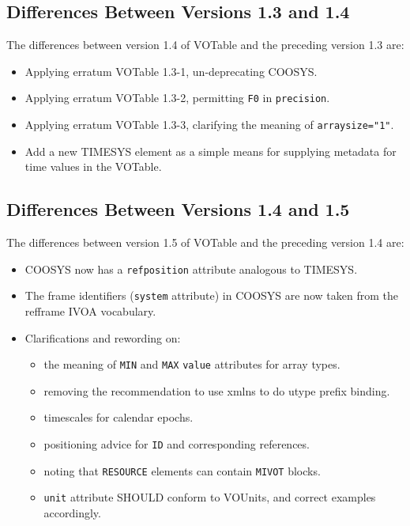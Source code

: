 \documentclass[11pt,a4paper]{ivoa}
\let\fg=\color
\def\attr#1{{\tt{\fg{DarkRed}#1}}}
\def\elem#1{{\tt{\fg{DarkRed}#1}}}
\def\attrval#1#2{{\tt{\fg{DarkRed}#1}="{\fg{DarkPurple}#2}"}}
\begin{document}
{{{\subsection{Differences Between Versions 1.3 and 1.4}
\label{diff1.3-1.4}
The differences between version 1.4 of VOTable and the preceding
version 1.3 are:

\begin{itemize}
\item Applying erratum VOTable 1.3-1, un-deprecating COOSYS.
\item Applying erratum VOTable 1.3-2, permitting \verb|F0| in
\attr{precision}.
\item Applying erratum VOTable 1.3-3, clarifying the meaning of
\attrval{arraysize}{1}.
\item Add a new TIMESYS element as a simple means for
     supplying metadata for time values in the VOTable.
\end{itemize}


\subsection{Differences Between Versions 1.4 and 1.5}
\label{diff1.4-1.5}
The differences between version 1.5 of VOTable and the preceding
version 1.4 are:

\begin{itemize}
\item COOSYS now has a \attr{refposition} attribute analogous to TIMESYS.
\item The frame identifiers (\attr{system} attribute) in COOSYS are now taken
from the refframe IVOA vocabulary.
\item Clarifications and rewording on:
  \begin{itemize}
    \item the meaning of \elem{MIN} and \elem{MAX} \attr{value} attributes for
    array types.
    \item removing the recommendation to use xmlns to do utype prefix binding.
    \item timescales for calendar epochs.
    \item positioning advice for \attr{ID} and corresponding references.
    \item noting that \elem{RESOURCE} elements can contain \elem{MIVOT} blocks.
    \item \attr{unit} attribute SHOULD conform to VOUnits,
          and correct examples accordingly.
  \end{itemize}
\end{itemize}

}}}
\end{document}
